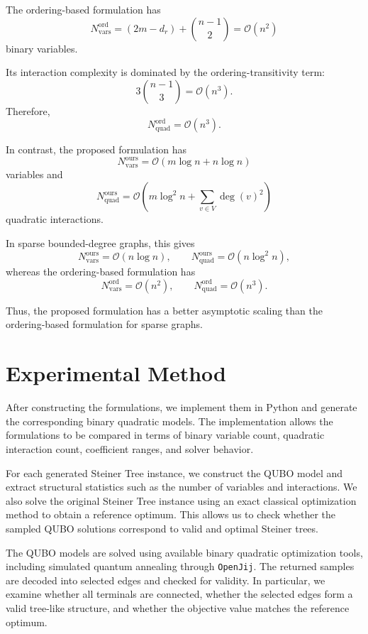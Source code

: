 \documentclass[a4paper,12pt]{report}
\begin{document}
The ordering-based formulation has
\[
N_{\text{vars}}^{\text{ord}}
=
(2m-d_r)+\binom{n-1}{2}
=
\mathcal{O}(n^2)
\]
binary variables.

Its interaction complexity is dominated by the ordering-transitivity term:
\[
3\binom{n-1}{3}
=
\mathcal{O}(n^3).
\]
Therefore,
\[
N_{\text{quad}}^{\text{ord}}
=
\mathcal{O}(n^3).
\]

In contrast, the proposed formulation has
\[
N_{\text{vars}}^{\text{ours}}
=
\mathcal{O}(m\log n+n\log n)
\]
variables and
\[
N_{\text{quad}}^{\text{ours}}
=
\mathcal{O}
\left(
m\log^2 n+\sum_{v\in V}\deg(v)^2
\right)
\]
quadratic interactions.

In sparse bounded-degree graphs, this gives
\[
N_{\text{vars}}^{\text{ours}}
=
\mathcal{O}(n\log n),
\qquad
N_{\text{quad}}^{\text{ours}}
=
\mathcal{O}(n\log^2 n),
\]
whereas the ordering-based formulation has
\[
N_{\text{vars}}^{\text{ord}}
=
\mathcal{O}(n^2),
\qquad
N_{\text{quad}}^{\text{ord}}
=
\mathcal{O}(n^3).
\]

Thus, the proposed formulation has a better asymptotic scaling than the ordering-based formulation for sparse graphs.

\section{Experimental Method}

After constructing the formulations, we implement them in Python and generate the corresponding binary quadratic models. The implementation allows the formulations to be compared in terms of binary variable count, quadratic interaction count, coefficient ranges, and solver behavior.

For each generated Steiner Tree instance, we construct the QUBO model and extract structural statistics such as the number of variables and interactions. We also solve the original Steiner Tree instance using an exact classical optimization method to obtain a reference optimum. This allows us to check whether the sampled QUBO solutions correspond to valid and optimal Steiner trees.

The QUBO models are solved using available binary quadratic optimization tools, including simulated quantum annealing through \texttt{OpenJij}. The returned samples are decoded into selected edges and checked for validity. In particular, we examine whether all terminals are connected, whether the selected edges form a valid tree-like structure, and whether the objective value matches the reference optimum.
\end{document}
